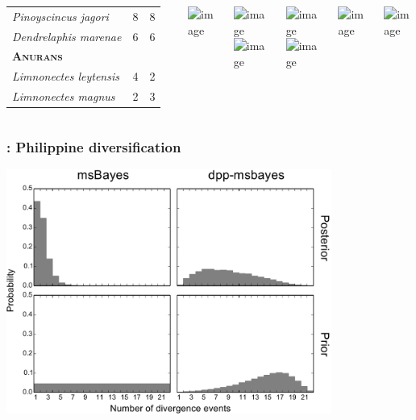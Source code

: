 \begin{frame}
\begin{columns}[c]
\begin{table}
\begin{tabular}{ l c c }
                \emph{Pinoyscincus jagori}          & 8  & 8  \\
                \emph{Dendrelaphis marenae}         & 6  & 6  \\
                \textbf{\textsc{Anurans}}  & & \\
                \emph{Limnonectes leytensis}        & 4  & 2  \\
                \emph{Limnonectes magnus}           & 2  & 3  \\
                \hline
            \end{tabular}
        \end{table}
        \centerline{
        \includegraphics<1>[height=1.5cm]{../images/photos/crocidura-negrina-JAEsselstyn.jpg}}
        \centerline{
        \includegraphics<1>[height=1.5cm]{../images/photos/hipposideros-obscurus-MRMDuya.jpg}
        \hspace{0.3mm}
        \includegraphics<1>[height=1.5cm]{../images/photos/haplonycteris-fischeri-JHolden.jpg}}
        \centerline{
        \includegraphics<1>[height=1.5cm]{../images/photos/gekko-mindorensis.jpg}
        \hspace{0.3mm}
        \includegraphics<1>[height=1.5cm]{../images/photos/sphenomorphus-arborens-rmb.jpg}}
        \centerline{
        \includegraphics<1>[height=1.5cm]{../images/photos/dendrelaphis-pictus-cds.jpg}}
        \centerline{
        \includegraphics<1>[height=1.5cm]{../images/photos/limnonectes-leytensis-rmb.jpg}}
\end{columns}
\end{frame}

\begin{frame}
    \frametitle{\dppmsbayes: Philippine diversification}
    \centerline{
    \includegraphics[width=0.8\textwidth]{../../empirical-analyses/plots/philippines-dpp-psi-posterior-old-vs-dpp-with-prior.pdf}}
\end{frame}

